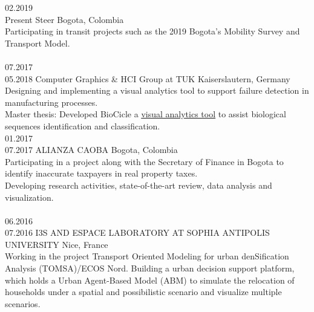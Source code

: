 \documentclass[english]{cv-style}          %
\begin{document}
\begin{entrylist}
\entry
  {02.2019\\Present}
  {Steer}
  {Bogota, Colombia}
  {\\
  Participating in transit projects such as the 2019 Bogota's Mobility Survey and Transport Model.\\
   \\
    {\vspace{-0.09cm}}}
\entry
  {07.2017\\05.2018}
  {Computer Graphics \& HCI Group at TUK}
  {Kaiserslautern, Germany}
  {\\
  Designing and implementing a visual analytics tool to support failure detection in manufacturing processes.\\
  Master thesis: Developed BioCicle a \underline{\href{https://github.com/mvanegas10/BioCicle}{visual analytics tool}} to assist biological sequences identification and classification. \\
    {\vspace{-0.09cm}}}
\entry
  {01.2017\\07.2017}
  {ALIANZA CAOBA}
  {Bogota, Colombia}
  {\\
  Participating in a project along with the Secretary of Finance in Bogota to identify inaccurate taxpayers in real property taxes. \\ 
  Developing research activities, state-of-the-art review, data analysis and visualization.	\\
   \\
    {\vspace{-0.09cm}}}
\entry
  {06.2016\\07.2016}
  {I3S AND ESPACE LABORATORY AT SOPHIA ANTIPOLIS UNIVERSITY}
  {Nice, France}
  {\\
  Working in the project Transport Oriented Modeling for urban denSification Analysis (TOMSA)/ECOS Nord. Building a urban decision support platform, which holds a Urban Agent-Based Model \textsc(ABM) to simulate the relocation of households under a spatial and possibilistic scenario and visualize multiple scenarios.\\
    {\vspace{-0.5cm}}}

\end{entrylist}
\end{document}
